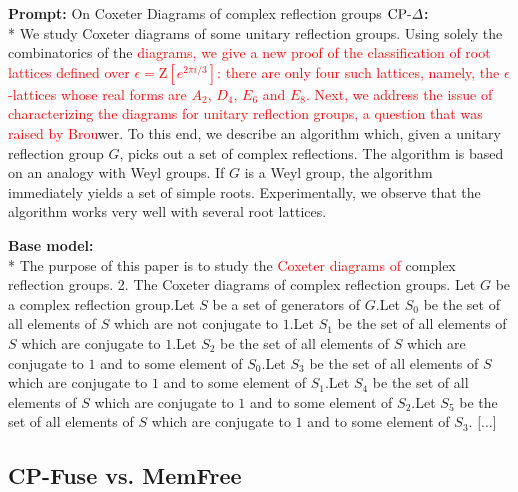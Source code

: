 \begin{breakablefigure}
\begin{cpfusetextbox}{\textbf{Prompt:} On Coxeter Diagrams of complex reflection groups}
\vspace{6pt}
        \textbf{\(\text{CP-}\Delta\):}\\*
We study Coxeter diagrams of some unitary reflection groups. Using solely the combinatorics of the \textcolor{red}{diagrams, we give a new proof of the classification of root lattices defined over \(\epsilon = \mathrm{Z}[e^{2 \pi i/3}]\): there are only four such lattices, namely, the \(\epsilon\)-lattices whose real forms are \(A_2\), \(D_4\), \(E_6\) and \(E_8\). Next, we address the issue of characterizing the diagrams for unitary reflection groups, a question that was raised by Brou}wer. To this end, we describe an algorithm which, given a unitary reflection group \(G\), picks out a set of complex reflections. The algorithm is based on an analogy with Weyl groups. If \(G\) is a Weyl group, the algorithm immediately yields a set of simple roots. Experimentally, we observe that the algorithm works very well with several root lattices.

\vspace{6pt}
        \textbf{Base model:}\\*
    The purpose of this paper is to study the \textcolor{red}{Coxeter diagrams of} complex reflection groups. 2. The Coxeter diagrams of complex reflection groups. Let \(G\) be a complex reflection group.Let \(S\) be a set of generators of \(G\).Let \(S_0\) be the set of all elements of \(S\) which are not conjugate to \(1\).Let \(S_1\) be the set of all elements of \(S\) which are conjugate to \(1\).Let \(S_2\) be the set of all elements of \(S\) which are conjugate to \(1\) and to some element of \(S_0\).Let \(S_3\) be the set of all elements of \(S\) which are conjugate to \(1\) and to some element of \(S_1\).Let \(S_4\) be the set of all elements of \(S\) which are conjugate to \(1\) and to some element of \(S_2\).Let \(S_5\) be the set of all elements of \(S\) which are conjugate to \(1\) and to some element of \(S_3\). [...]
    \end{cpfusetextbox}
    \label{fig:example1_text_methods}
\end{breakablefigure}

\FloatBarrier
\clearpage
\subsection{CP-Fuse vs. MemFree}
\label{app:cpfuse-comparison-memfree}

